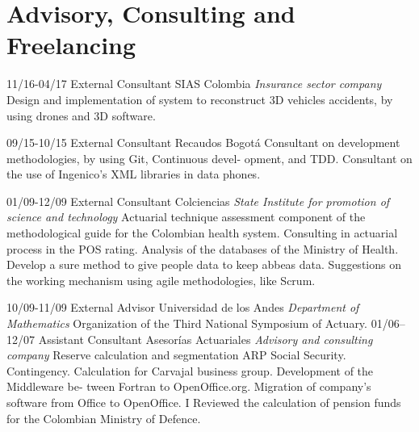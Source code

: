 \section{Advisory, Consulting and Freelancing}
\begin{entrylist}

  \entry
	{11/16-04/17}
	{External Consultant}
	{SIAS Colombia {\sl Insurance sector company}}
	{Design and implementation of system to reconstruct 3D vehicles accidents,
	by using drones and 3D software.}
\end{entrylist}

\begin{entrylist}
  \entry
	{09/15-10/15}
	{External Consultant}
	{Recaudos Bogotá}
        {Consultant on development methodologies, by using Git, Continuous devel-
opment, and TDD.
	Consultant on the use of Ingenico’s XML libraries in data phones.}

  \entry
	{01/09-12/09}
	{External Consultant}
	{Colciencias {\sl State Institute for promotion of science and technology}}
        {Actuarial technique assessment component of the methodological guide for
	the Colombian health system.
	Consulting in actuarial process in the POS rating.
	Analysis of the databases of the Ministry of Health.
	Develop a sure method to give people data to keep abbeas data.
	Suggestions on the working mechanism using agile methodologies, like
	Scrum.}
\end{entrylist}

\begin{entrylist}
  \entry
	{10/09-11/09}
	{External Advisor}
	{Universidad de los Andes {\sl Department of Mathematics}}
	{Organization of the Third National Symposium of Actuary.}
  \entry
	{01/06–12/07}
	{Assistant Consultant}
	{Asesorías Actuariales {\sl Advisory and consulting company}}
	{Reserve calculation and segmentation ARP Social Security. Contingency.
Calculation for Carvajal business group. Development of the Middleware be-
tween Fortran to OpenOffice.org.
Migration of company’s software from Office to OpenOffice.
I Reviewed the calculation of pension funds for the Colombian Ministry of
	Defence.}
\end{entrylist}
